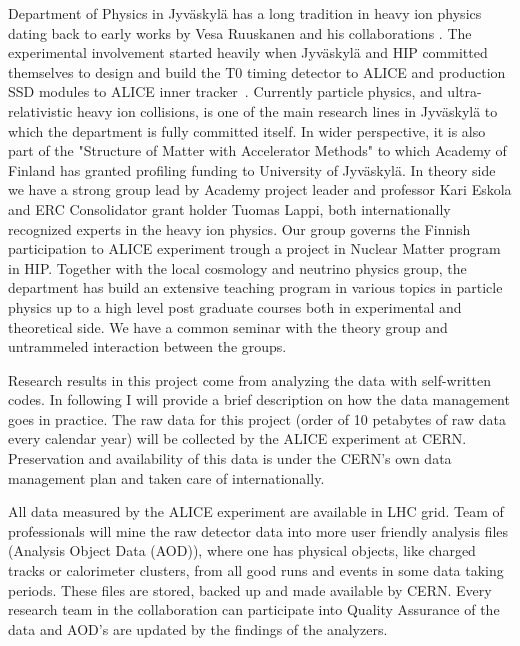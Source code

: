 Department of Physics in Jyv\"askyl\"a has a long tradition in heavy ion physics dating back to early works by Vesa Ruuskanen and his collaborations \cite{VonGersdorff:1986tqh}. The experimental involvement started heavily when Jyv\"askyl\"a and HIP committed themselves to design and build the T0 timing detector to ALICE and production SSD modules to ALICE inner tracker~\cite{Dellacasa:1999kf}. Currently particle physics, and ultra-relativistic heavy ion collisions, is one of the main research lines in Jyv\"askyl\"a to which the department is fully committed itself. In wider perspective, it is also part of the "Structure of Matter with Accelerator Methods" to which Academy of Finland has granted profiling funding to University of Jyv\"askyl\"a. In theory side we have a strong group lead by Academy project leader and professor Kari Eskola and ERC Consolidator grant holder Tuomas Lappi, both internationally recognized experts in the heavy ion physics. Our group governs the Finnish participation to ALICE experiment trough a project in Nuclear Matter program in HIP. Together with the local cosmology and neutrino physics group, the department has build an extensive teaching program in various topics in particle physics up to a high level post graduate courses both in experimental and theoretical side. We have a common seminar with the theory group and untrammeled interaction between the groups.

Research results in this project come from analyzing the data with self-written codes. In following I will provide a brief description on how the data management goes in practice. 
The raw data for this project (order of 10 petabytes of raw data every calendar year) will be collected by the ALICE experiment at CERN. 
Preservation and availability of this data is under the CERN's own data management plan and taken care of internationally.

All data measured by the ALICE experiment are available in LHC grid. Team of professionals will mine the raw detector data into more user friendly analysis files (Analysis Object Data (AOD)), where one has physical objects, like charged tracks or calorimeter clusters, from all good runs and events in some data taking periods. These files are stored, backed up and made available by CERN. Every research team in the collaboration can participate into Quality Assurance of the data and AOD's are updated by the findings of the analyzers.

